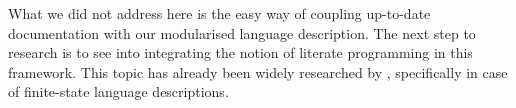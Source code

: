 \documentclass[11pt]{article}
\begin{document}
What we did not address here is the easy way of coupling up-to-date
documentation with our modularised language description. The next step to
research is to see into integrating the notion of literate programming in this
framework. This topic has already been widely researched by
, specifically in case of finite-state language
descriptions.





\end{document}
